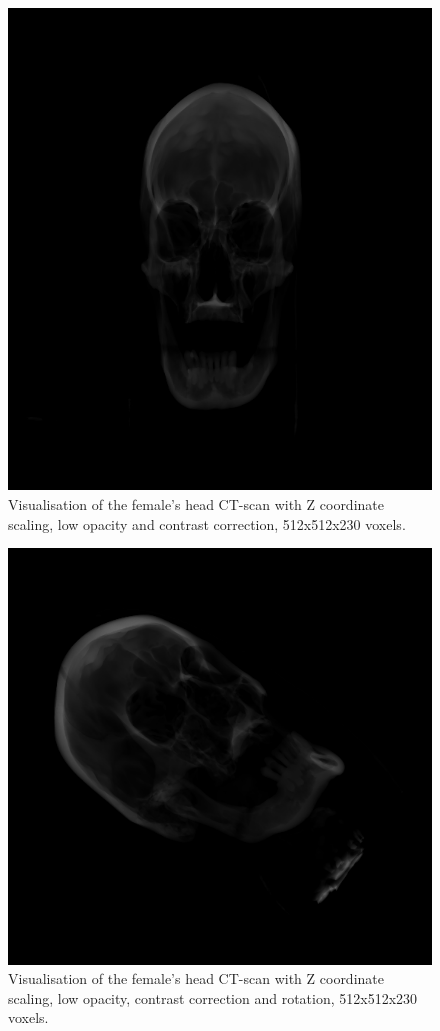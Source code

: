 \documentclass[twoside, english, 11pt]{report}
\begin{document}
\begin{figure}[H]
\centerline{\includegraphics[scale = 0.5]{img/head-op}}
\caption{Visualisation of the female's head CT-scan with Z coordinate scaling, low opacity and contrast correction, 512x512x230 voxels.\label{fig:head-op}}
\end{figure}

\begin{figure}[H]
\centerline{\includegraphics[scale = 0.5]{img/head-op-rot}}
\caption{Visualisation of the female's head CT-scan with Z coordinate scaling, low opacity, contrast correction and rotation, 512x512x230 voxels.\label{fig:head-op-rot}}
\end{figure}
\end{document}
